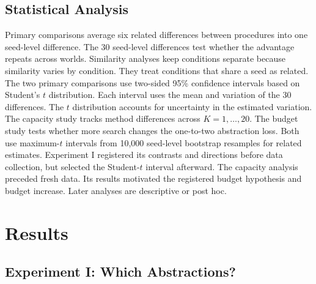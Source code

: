 \documentclass[10pt]{article}
\begin{document}
\subsection{Statistical Analysis}

Primary comparisons average six related differences between procedures into
one seed-level difference. The 30 seed-level differences test whether the
advantage repeats across worlds. Similarity analyses keep conditions separate
because similarity varies by condition. They treat conditions that share a
seed as related. The two primary comparisons use two-sided 95\% confidence
intervals based on Student's $t$ distribution.
Each interval uses the mean and variation of the 30 differences. The $t$
distribution accounts for
uncertainty in the estimated variation. The capacity study tracks method differences across
$K=1,\ldots,20$. The budget study tests whether more search changes the
one-to-two abstraction loss. Both use maximum-$t$ intervals from 10,000
seed-level bootstrap resamples for related estimates. Experiment I registered
its contrasts and directions before data collection, but selected the
Student-$t$ interval afterward. The capacity analysis preceded fresh data. Its
results motivated the registered budget hypothesis and budget increase. Later
analyses are descriptive or post hoc.

\section{Results}

\subsection{Experiment I: Which Abstractions?}
\end{document}
